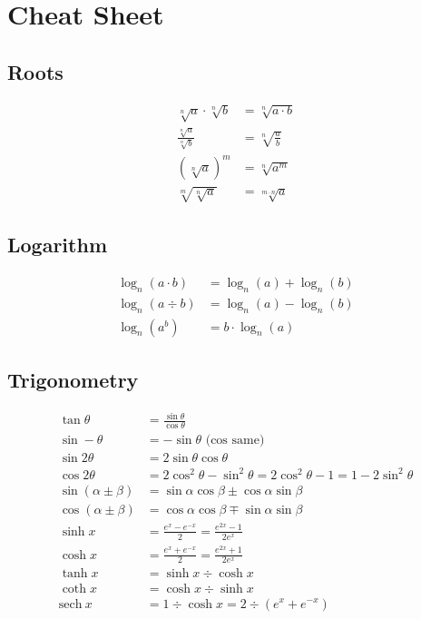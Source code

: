 \section{Cheat Sheet}

\subsection{Roots}

\begin{align*}
    \sqrt[n]{a}\cdot\sqrt[n]{b} & = \sqrt[n]{a\cdot b} \\
    \frac{\sqrt[n]{a}}{\sqrt[n]{b}} & = \sqrt[n]{\frac{a}{b}} \\
    (\sqrt[n]{a})^m & = \sqrt[n]{a^m} \\
    \sqrt[m]{\sqrt[n]{a}} & = \sqrt[m\cdot n]{a}
\end{align*}

\subsection{Logarithm}

\begin{align*}
    \log_n(a\cdot b) & = \log_n(a) + \log_n(b) \\
    \log_n(a\div b) & = \log_n(a) - \log_n(b) \\
    \log_n(a^b) & = b \cdot \log_n(a)
\end{align*}

\subsection{Trigonometry}

\begin{align*}
    \tan\theta & = \frac{\sin\theta}{\cos\theta} \\
    \sin -\theta & = -\sin\theta\text{ (cos same)} \\
    \sin 2\theta & = 2\sin\theta\cos\theta \\
    \cos 2\theta & = 2\cos^2\theta - \sin^2\theta = 2\cos^2\theta - 1 = 1 - 2\sin^2\theta \\
    \sin(\alpha \pm \beta) & = \sin\alpha\cos\beta\pm\cos\alpha\sin\beta \\
    \cos(\alpha\pm\beta) & = \cos\alpha\cos\beta \mp \sin\alpha\sin\beta \\
    \sinh x & = \frac{e^x - e^{-x}}{2}=\frac{e^{2x}-1}{2e^x} \\
    \cosh x & = \frac{e^x + e^{-x}}{2} = \frac{e^{2x}+1}{2e^x} \\
    \tanh x & = \sinh x \div \cosh x \\
    \coth x & = \cosh x \div \sinh x \\
    \mathrm{sech}\ x & = 1 \div \cosh x = 2 \div (e^x+e^{-x})
\end{align*}

